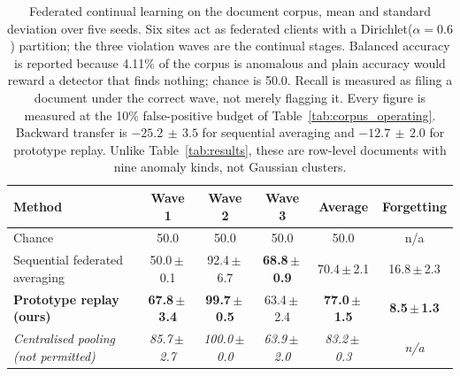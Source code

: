 \documentclass[11pt,a4paper]{article}
\begin{document}
\begin{table}[htbp]
\centering
\caption{Federated continual learning on the document corpus, mean and standard
deviation over five seeds. Six sites act as federated clients with a
Dirichlet($\alpha{=}0.6$) partition; the three violation waves are the continual
stages. Balanced accuracy is reported because 4.11\% of the corpus is anomalous
and plain accuracy would reward a detector that finds nothing; chance is 50.0.
Recall is measured as filing a document under the correct wave, not merely
flagging it. Every figure is measured at the 10\% false-positive budget of
Table~\ref{tab:corpus_operating}. Backward transfer is $-25.2\,\pm\,3.5$ for
sequential averaging and $-12.7\,\pm\,2.0$ for prototype replay. Unlike
Table~\ref{tab:results}, these are row-level documents with nine anomaly kinds,
not Gaussian clusters.}
\label{tab:corpus}
\small
\setlength{\tabcolsep}{4.5pt}
\begin{tabular}{@{}l c c c c c@{}}
\toprule
\textbf{Method} & \textbf{Wave 1} & \textbf{Wave 2} & \textbf{Wave 3} &
\textbf{Average} & \textbf{Forgetting} \\
\midrule
Chance & 50.0 & 50.0 & 50.0 & 50.0 & n/a \\
Sequential federated averaging & 50.0\,$\pm$\,0.1 & 92.4\,$\pm$\,6.7 &
  \textbf{68.8\,$\pm$\,0.9} & 70.4\,$\pm$\,2.1 & 16.8\,$\pm$\,2.3 \\
\textbf{Prototype replay (ours)} & \textbf{67.8\,$\pm$\,3.4} &
  \textbf{99.7\,$\pm$\,0.5} & 63.4\,$\pm$\,2.4 & \textbf{77.0\,$\pm$\,1.5} &
  \textbf{8.5\,$\pm$\,1.3} \\
\midrule
\textit{Centralised pooling (not permitted)} & \textit{85.7\,$\pm$\,2.7} &
  \textit{100.0\,$\pm$\,0.0} & \textit{63.9\,$\pm$\,2.0} & \textit{83.2\,$\pm$\,0.3} &
  \textit{n/a} \\
\bottomrule
\end{tabular}
\end{table}
\end{document}
